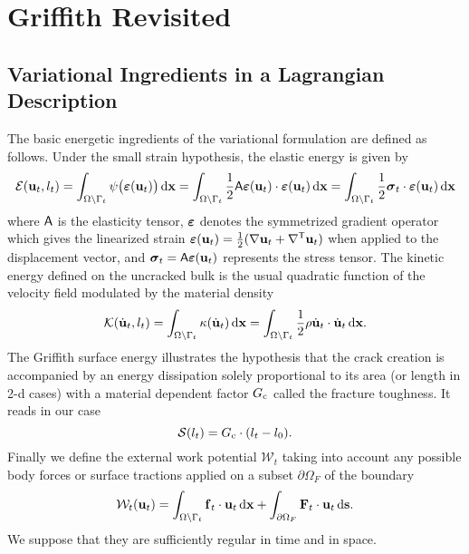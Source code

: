 \appendix

\chapter{Griffith Revisited} \label{chap:griffithrevis}
\section{Variational Ingredients in a Lagrangian Description}
The basic energetic ingredients of the variational formulation are defined as follows. Under the small strain hypothesis, the elastic energy is given by
\begin{equation} \label{eq:elastic}
\mathcal{E}(\vec{u}_t,l_t)=\int_\domaint\psi\bigl(\eps(\vec{u}_t)\bigr)\dx=\int_\domaint\frac{1}{2}\tens{A}\eps(\vec{u}_t)\cdot\eps(\vec{u}_t)\dx=\int_\domaint\frac{1}{2}\sig_t\cdot\eps(\vec{u}_t)\dx
\end{equation}
where $\mathsf{A}$ is the elasticity tensor, $\eps$ denotes the symmetrized gradient operator which gives the linearized strain $\eps(\vec{u}_t)=\frac{1}{2}(\nabla\vec{u}_t+\nabla^\mT\vec{u}_t)$ when applied to the displacement vector, and $\sig_t=\tens{A}\eps(\vec{u}_t)$ represents the stress tensor. The kinetic energy defined on the uncracked bulk is the usual quadratic function of the velocity field modulated by the material density
\begin{equation} \label{eq:kinetic}
\mathcal{K}(\dot{\vec{u}}_t,l_t)=\int_\domaint\kappa(\dot{\vec{u}}_t)\dx=\int_\domaint\frac{1}{2}\rho\dot{\vec{u}}_t\cdot\dot{\vec{u}}_t\dx.
\end{equation}
The Griffith surface energy \cite{Griffith:1921} illustrates the hypothesis that the crack creation is accompanied by an energy dissipation solely proportional to its area (or length in 2-d cases) with a material dependent factor $G_\mathrm{c}$ called the fracture toughness. It reads in our case
\begin{equation} \label{eq:griffith}
\mathcal{S}(l_t)=G_\mathrm{c}\cdot(l_t-l_0).
\end{equation}
Finally we define the external work potential $\mathcal{W}_t$ taking into account any possible body forces or surface tractions applied on a subset ${\partial\Omega_F}$ of the boundary
\begin{equation} \label{eq:externalwork}
\mathcal{W}_t(\vec{u}_t)=\int_\domaint \vec{f}_t\cdot\vec{u}_t\dx+\int_{\partial\Omega_F} \vec{F}_t\cdot\vec{u}_t\D{\vec{s}}.
\end{equation}
We suppose that they are sufficiently regular in time and in space.

